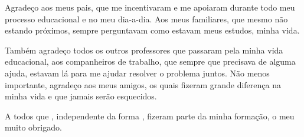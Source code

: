 \begin{agradecimentos}
Agradeço aos meus pais, que me incentivaram e me apoiaram durante todo meu processo educacional e no meu dia-a-dia.  Aos meus familiares, que mesmo não estando próximos, sempre perguntavam como estavam meus estudos, minha vida.

Também agradeço todos os outros professores que passaram pela minha vida educacional, aos companheiros de trabalho, que sempre que precisava de alguma ajuda, estavam lá para me ajudar resolver o problema juntos. Não menos importante, agradeço aos meus amigos, os quais fizeram grande diferença na minha vida e que jamais serão esquecidos.

A todos que , independente da forma , fizeram parte da minha formação, o meu muito obrigado.

\end{agradecimentos}